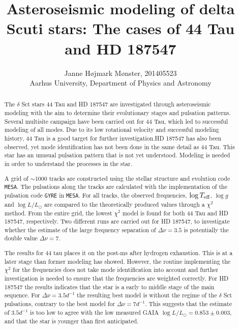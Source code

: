 \documentclass[a4paper,twoside,11pt]{memoir}
\title{Asteroseismic modeling of delta Scuti stars: The cases of 44 Tau and HD 187547}
\author{Janne Højmark Mønster, 201405523\\ Aarhus University, Department of Physics and Astronomy}
\newcommand{\chis}{\ensuremath{\chi^2}\xspace}
\newcommand{\teff}{\ensuremath{\log T_{\textup{eff}}}\xspace}
\newcommand{\lum}{\ensuremath{\log L / L_{\odot}}\xspace}
\newcommand{\logg}{\ensuremath{\log g}\xspace}
\begin{document}
\maketitle
\thispagestyle{empty}
\vspace{0.5cm}
\newpage
\begin{abstract}
	
	The $\delta$ Sct stars 44 Tau and HD 187547 are investigated through asteroseismic modeling with the aim to determine their evolutionary stages and pulsation patterns. Several multisite campaign have been carried out for 44 Tau, which led to successful modeling of all modes. Due to its low rotational velocity and successful modeling history, 44 Tau is a good target for further investigation.HD 187547 has also been observed, yet mode identification has not been done in the same detail as 44 Tau. This star has an unusual pulsation pattern  that is not yet understood. Modeling is needed in order to understand the processes in the star. 
	
	A grid of  $\sim$1000 tracks are constructed using the stellar structure and evolution code \texttt{MESA}. The pulsations along the tracks are calculated with the implementation of the pulsation code \texttt{GYRE} in \texttt{MESA}. For all tracks, the observed frequencies, \teff, \logg and \lum are compared to the theoretically produced values through a \chis method. From the entire grid, the lowest \chis model is found for both 44 Tau and HD 187547, respectively. Two different runs are carried out for HD 187547, to investigate whether the estimate of the large frequency separation of $\Delta\nu = 3.5$ is potentially the double value $\Delta\nu=7$. 
	
	The results for 44 tau places it on the post-ms after hydrogen exhaustion. This is at a later stage than former modeling has showed. However, the routine implementing the \chis for the frequencies does not take mode identification into account and further investigation is needed to ensure that the frequencies are weighted correctly. For HD 187547 the results indicates that the star is a early to middle stage of the main sequence.  For $\Delta\nu = 3.5 d^{-1}$ the resulting best model is without the regime of the $\delta$ Sct pulsations, contrary to the best model for $\Delta\nu = 7d^{-1}$. This suggests that the estimate of $3.5 d^{-1}$ is too low to agree with the low measured GAIA \lum$=0.853\pm0.003$, and that the star is younger than first anticipated.  
	

\end{abstract}
\newpage
\end{document}
